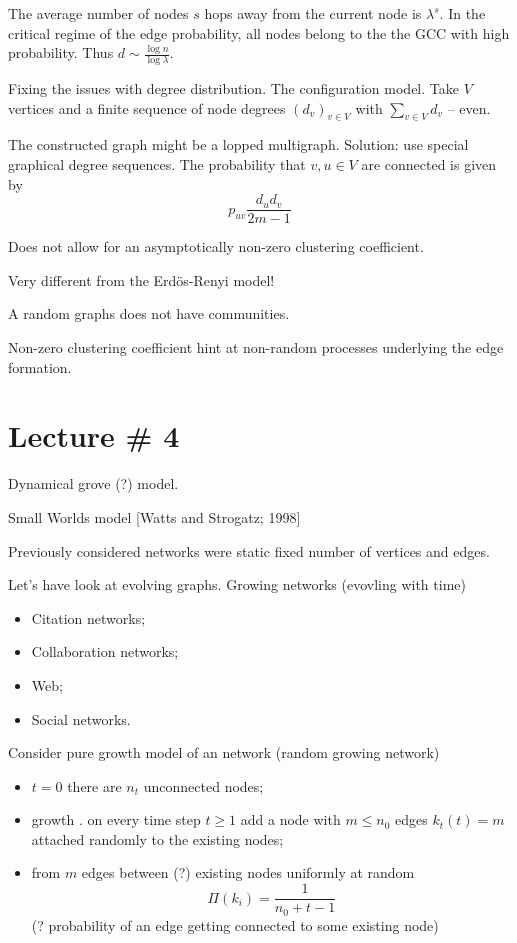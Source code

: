 \documentclass[a4paper]{article}
\newcommand{\brac}[1]{{\left ( #1 \right )}}
\begin{document}
The average number of nodes $s$ hops away from the current node is $\lambda^s$.
In the critical regime of the edge probability, all nodes belong to the the GCC with high probability.
Thus $d \sim \frac{\log n}{\log \lambda}$.

Fixing the issues with degree distribution.
The configuration model.
Take $V$ vertices and a finite sequence of node degrees $\brac{d_v}_{v\in V}$ with $\sum_{v\in V} d_v$ -- even.

The constructed graph might be a lopped multigraph.
Solution: use special graphical degree sequences.
The probability that $v,u\in V$ are connected is given by
\[p_{uv}\frac{d_u d_v}{2 m - 1}\]

Does not allow for an asymptotically non-zero clustering coefficient.

Very different from the Erd\"os-Renyi model!

A random graphs does not have communities.

Non-zero clustering coefficient hint at non-random processes underlying the edge formation.


\section{Lecture \# 4} %
\label{sec:lecture_4}

Dynamical grove (?) model.

Small Worlds model [Watts and Strogatz; 1998]

Previously considered networks were static fixed number of vertices and edges.

Let's have look at evolving graphs.
Growing networks (evovling with time)
\begin{itemize}
	\item Citation networks;
	\item Collaboration networks;
	\item Web;
	\item Social networks.
\end{itemize}

Consider pure growth model of an network (random growing network)
\begin{itemize}
	\item $t=0$ there are $n_t$ unconnected nodes;
	\item growth . on every time step $t\geq 1$ add a node with $m\leq n_0$ edges $k_t(t) = m$ attached randomly to the existing nodes;
	\item from $m$ edges between (?) existing nodes uniformly at random \[\Pi(k_i) = \frac{1}{n_0+t-1}\] (? probability of an edge getting connected to some existing node)
\end{itemize}
\end{document}
